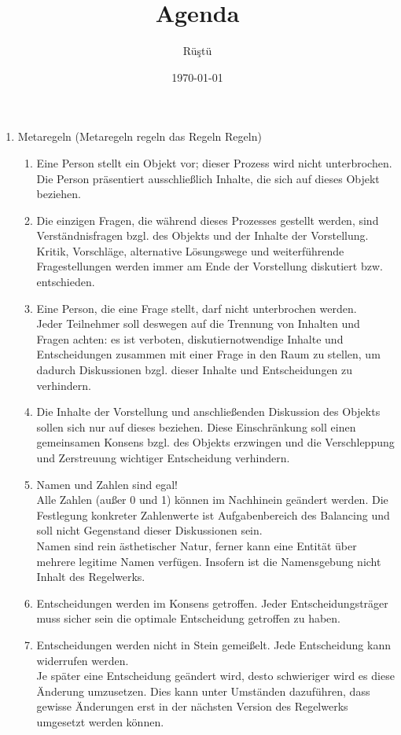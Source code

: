 \documentclass{article}
\begin{document}
\title{Agenda}
\date{\today}
\author{Rü\c stü}
\maketitle
\begin{enumerate}

\item Metaregeln (Metaregeln regeln das Regeln Regeln)
\begin{enumerate}
\item Eine Person stellt ein Objekt vor; dieser Prozess wird nicht unterbrochen. Die Person präsentiert ausschließlich Inhalte, die sich auf dieses Objekt beziehen.
\item Die einzigen Fragen, die während dieses Prozesses gestellt werden, sind Verständnisfragen bzgl. des Objekts und der Inhalte der Vorstellung.\\
Kritik, Vorschläge, alternative Lösungswege und weiterführende Fragestellungen werden immer am Ende der Vorstellung diskutiert bzw. entschieden.
\item Eine Person, die eine Frage stellt, darf nicht unterbrochen werden.\\
Jeder Teilnehmer soll deswegen auf die Trennung von Inhalten und Fragen achten: es ist verboten, diskutiernotwendige Inhalte und Entscheidungen zusammen mit einer Frage in den Raum zu stellen, um dadurch Diskussionen bzgl. dieser Inhalte und Entscheidungen zu verhindern.
\item Die Inhalte der Vorstellung und anschließenden Diskussion des Objekts sollen sich nur auf dieses beziehen. Diese Einschränkung soll einen gemeinsamen Konsens bzgl. des Objekts erzwingen und die Verschleppung und Zerstreuung wichtiger Entscheidung verhindern.
\item Namen und Zahlen sind egal!\\
Alle Zahlen (außer 0 und 1) können im Nachhinein geändert werden. Die Festlegung konkreter Zahlenwerte ist Aufgabenbereich des Balancing und soll nicht Gegenstand dieser Diskussionen sein.\\
Namen sind rein ästhetischer Natur, ferner kann eine Entität über mehrere legitime Namen verfügen. Insofern ist die Namensgebung nicht Inhalt des Regelwerks.
\item Entscheidungen werden im Konsens getroffen. Jeder Entscheidungsträger muss sicher sein die optimale Entscheidung getroffen zu haben.
\item Entscheidungen werden nicht in Stein gemeißelt. Jede Entscheidung kann widerrufen werden.\\Je später eine Entscheidung geändert wird, desto schwieriger wird es diese Änderung umzusetzen. Dies kann unter Umständen dazuführen, dass gewisse Änderungen erst in der nächsten Version des Regelwerks umgesetzt werden können.
\end{enumerate}


\end{enumerate}
\end{document}
